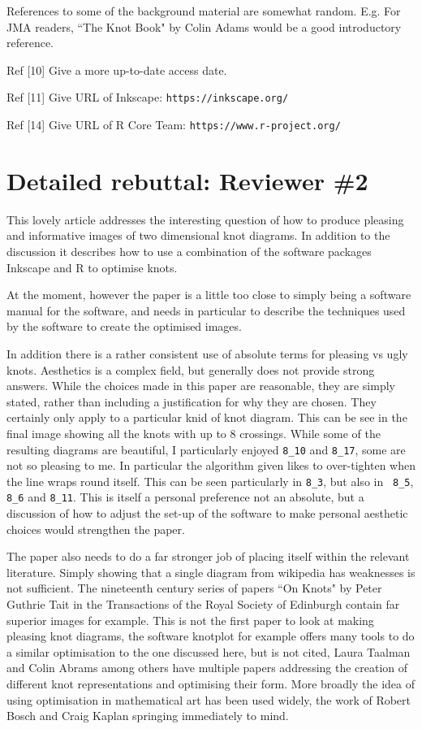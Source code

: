\documentclass[12pt]{article}
\begin{document}
References to some of the background material are somewhat random.
E.g.  For JMA readers, ``The Knot Book" by Colin Adams would be a good
introductory reference.

Ref [10]  Give a more up-to-date access date.

Ref [11]  Give URL of  Inkscape:  {\tt https://inkscape.org/}

Ref [14]  Give URL of  R Core Team:  {\tt https://www.r-project.org/}


\section*{Detailed rebuttal: Reviewer \#2}

This lovely article addresses the interesting question of
how to produce pleasing and informative images of two dimensional knot
diagrams. In addition to the discussion it describes how to use a
combination of the software packages Inkscape and R to optimise knots.

At the moment, however the paper is a little too close to simply being
a software manual for the software, and needs in particular to
describe the techniques used by the software to create the optimised
images.

In addition there is a rather consistent use of absolute terms for
pleasing vs ugly knots. Aesthetics is a complex field, but generally
does not provide strong answers. While the choices made in this paper
are reasonable, they are simply stated, rather than including a
justification for why they are chosen. They certainly only apply to a
particular knid of knot diagram. This can be see in the final image
showing all the knots with up to 8 crossings. While some of the
resulting diagrams are beautiful, I particularly enjoyed {\tt 8\_10}
and {\tt 8\_17}, some are not so pleasing to me. In particular the
algorithm given likes to over-tighten when the line wraps round
itself. This can be seen particularly in {\tt 8\_3}, but also in {\tt
  8\_5}, {\tt 8\_6} and {\tt 8\_11}. This is itself a personal
preference not an absolute, but a discussion of how to adjust the
set-up of the software to make personal aesthetic choices would
strengthen the paper.

The paper also needs to do a far stronger job of placing itself within
the relevant literature. Simply showing that a single diagram from
wikipedia has weaknesses is not sufficient. The nineteenth century
series of papers ``On Knots" by Peter Guthrie Tait in the Transactions
of the Royal Society of Edinburgh contain far superior images for
example. This is not the first paper to look at making pleasing knot
diagrams, the software knotplot for example offers many tools to do a
similar optimisation to the one discussed here, but is not cited,
Laura Taalman and Colin Abrams among others have multiple papers
addressing the creation of different knot representations and
optimising their form. More broadly the idea of using optimisation in
mathematical art has been used widely, the work of Robert Bosch and
Craig Kaplan springing immediately to mind.
\end{document}
